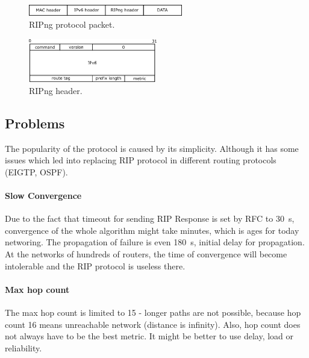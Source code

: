 \documentclass[10pt,a4paper,titlepage]{article}
\begin{document}
                \begin{figure}[h!]
                    \begin{center}
                        \includegraphics[width=0.6\textwidth]{ripng_hs.png}
                        \caption{RIPng protocol packet. \label{fig:RIPngheaders}}
                    \end{center}
                \end{figure}

                \begin{figure}[h!]
                    \begin{center}
                        \includegraphics[width=0.50\textwidth]{ripng_h.png}
                        \caption{RIPng header. \label{fig:RIPngheader}}
                    \end{center}
                \end{figure}

        \subsection{Problems}
            The popularity of the protocol is caused by its simplicity. Although it has some issues which led into replacing
            RIP protocol in different routing protocols (EIGTP, OSPF).
            \paragraph{Slow Convergence}
                Due to the fact that timeout for sending RIP Response is set by RFC to 30~s, convergence of the whole algorithm
                might take minutes, which is ages for today networing. The propagation of failure is even 180~s, initial delay
                for propagation. At the networks of hundreds of routers, the time of convergence will become intolerable and
                the RIP protocol is useless there.
            \paragraph{Max hop count}
                The max hop count is limited to 15 - longer paths are not possible, because hop count 16 means unreachable network
                (distance is infinity). Also, hop count does not always have to be the best metric. It might be better to use delay,
                load or reliability.
\end{document}
